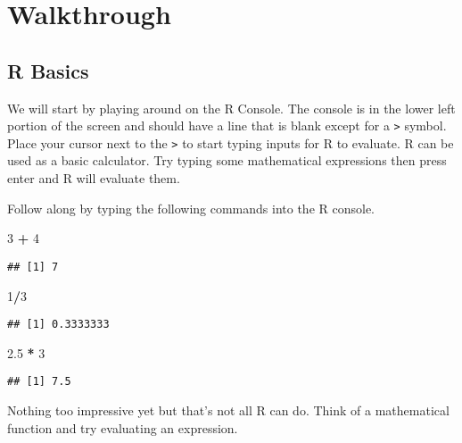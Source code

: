 \documentclass[]{book}
\newenvironment{Shaded}{\begin{snugshade}}{\end{snugshade}}
\newcommand{\DecValTok}[1]{\textcolor[rgb]{0.00,0.00,0.81}{#1}}
\newcommand{\FloatTok}[1]{\textcolor[rgb]{0.00,0.00,0.81}{#1}}
\newcommand{\StringTok}[1]{\textcolor[rgb]{0.31,0.60,0.02}{#1}}
\newcommand{\OperatorTok}[1]{\textcolor[rgb]{0.81,0.36,0.00}{\textbf{#1}}}
\begin{document}
\section{Walkthrough}\label{walkthrough}

\subsection{R Basics}\label{r-basics}

We will start by playing around on the R Console. The console is in the
lower left portion of the screen and should have a line that is blank
except for a \texttt{\textgreater{}} symbol. Place your cursor next to
the \texttt{\textgreater{}} to start typing inputs for R to evaluate. R
can be used as a basic calculator. Try typing some mathematical
expressions then press enter and R will evaluate them.

Follow along by typing the following commands into the R console.

\begin{Shaded}
\begin{Highlighting}[]
\DecValTok{3} \OperatorTok{+}\StringTok{ }\DecValTok{4}
\end{Highlighting}
\end{Shaded}

\begin{verbatim}
## [1] 7
\end{verbatim}

\begin{Shaded}
\begin{Highlighting}[]
\DecValTok{1}\OperatorTok{/}\DecValTok{3}
\end{Highlighting}
\end{Shaded}

\begin{verbatim}
## [1] 0.3333333
\end{verbatim}

\begin{Shaded}
\begin{Highlighting}[]
\FloatTok{2.5} \OperatorTok{*}\StringTok{ }\DecValTok{3}
\end{Highlighting}
\end{Shaded}

\begin{verbatim}
## [1] 7.5
\end{verbatim}

Nothing too impressive yet but that's not all R can do. Think of a
mathematical function and try evaluating an expression.
\end{document}
